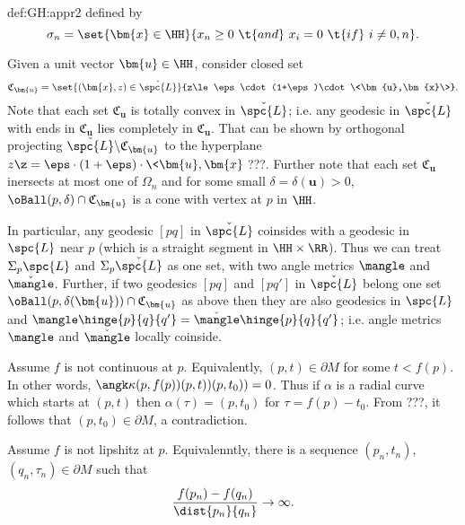 {\begin{subthm}{def:GH:appr2}
defined by 
$$\sigma_n=\set{\bm{x}\in\HH}{x_n\ge0\ \t{and}\ x_i=0\ \t{if}\ i\not=0,n}.$$










Given a unit vector $\bm{u}\in \HH$, consider closed set 
$$\mathfrak{C}_{\bm{u}}=\set{(\bm{x},z)\in \check{\spc{L}}}
{z\le\eps\cdot(1+\eps)\cdot \<\bm{u},\bm{x}\>}.$$
Note that each set $\mathfrak{C}_{\bm{u}}$ is totally convex in $\check{\spc{L}}$;
i.e. any geodesic in $\check{\spc{L}}$ with ends in $\mathfrak{C}_{\bm{u}}$ lies completely in $\mathfrak{C}_{\bm{u}}$.
That can be shown by orthogonal projecting $\check{\spc{L}}\backslash \mathfrak{C}_{\bm{u}}$ to the hyperplane
$z\z=\eps\cdot(1+\eps)\cdot \<\bm{u},\bm{x}\>$???.
Further note that each set $\mathfrak{C}_{\bm{u}}$ inersects at most one of $\Omega_n$ 
and for some small $\delta=\delta(\bm{u})>0$, $\oBall(p,\delta)\cap\mathfrak{C}_{\bm{u}}$ is a cone with vertex at $p$ in $\HH$.

In particular, any geodesic $[p q]$ in $\check{\spc{L}}$ coinsides with a geodesic in $\spc{L}$ near $p$ (which is a straight segment in $\HH\times\RR$).
Thus we can treat $\Sigma_p\spc{L}$ and $\Sigma_p\check{\spc{L}}$ as one set, with two angle metrics $\mangle$ and $\check\mangle$.
Further, if two geodesics $[pq]$ and $[pq']$ in $\check{\spc{L}}$ belong one set $\oBall(p,\delta(\bm{u}))\cap\mathfrak{C}_{\bm{u}}$ as above then they are also geodesics in $\spc{L}$ and $\mangle\hinge{p}{q}{q'}=\check\mangle\hinge{p}{q}{q'}$;
i.e. angle metrics $\mangle$ and $\check\mangle$ locally coinside.













Assume $f$ is not continuous at $p$.
Equivalently, $(p,t)\in\partial M$ for some $t<f(p)$.
In other words, $\angk\kappa{(p,f(p))}{(p,t))}{(p,t_0))}=0$.
Thus if $\alpha$ is a radial curve which starts at $(p,t)$ 
then $\alpha(\tau)=(p,t_0)$ for $\tau=f(p)-t_0$.
From ???, it follows that $(p,t_0)\in\partial M$, a contradiction.

Assume $f$ is not lipshitz at $p$.
Equivalenntly, there is a sequence $(p_n,t_n)$, $(q_n,\tau_n)\in\partial M$ such that $$\frac{f(p_n)-f(q_n)}{\dist{p_n}{q_n}}\to\infty.$$


\end{subthm}}
